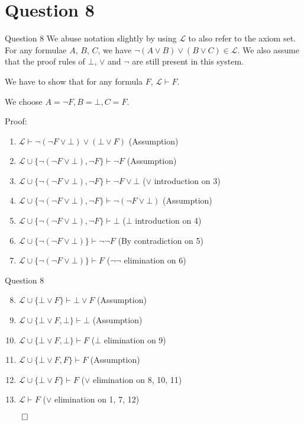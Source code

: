 \documentclass{beamer}
\begin{document}
    \section{Question 8}
    {
        \begin{frame}{Question 8}
            We abuse notation slightly by using $\mathcal{L}$ to also refer to the axiom set. For any formulae $A$, $B$, $C$, we have $\neg \left(A \lor B\right) \lor (B \lor C) \in \mathcal{L}$. We also assume that the proof rules of $\bot$, $\lor$ and $\neg$ are still present in this system.

            We have to show that for any formula $F$, $\mathcal{L} \vdash F$.

            We choose $A = \neg F, B = \bot, C = F$.

            Proof:
            \begin{enumerate}
                \item $\mathcal{L} \vdash \neg (\neg F \lor \bot) \lor (\bot \lor F)$ (Assumption)
                \item $\mathcal{L} \cup \{\neg (\neg F \lor \bot), \neg F\} \vdash \neg F$ (Assumption)
                \item $\mathcal{L} \cup \{\neg (\neg F \lor \bot), \neg F\} \vdash \neg F \lor \bot$ ($\lor$ introduction on 3)
                \item $\mathcal{L} \cup \{\neg (\neg F \lor \bot), \neg F\} \vdash \neg (\neg F \lor \bot)$ (Assumption)
                \item $\mathcal{L} \cup \{\neg (\neg F \lor \bot), \neg F\} \vdash \bot$ ($\bot$ introduction on 4)
                \item $\mathcal{L} \cup \{\neg (\neg F \lor \bot)\} \vdash \neg \neg F$ (By contradiction on 5)
                \item $\mathcal{L} \cup \{\neg (\neg F \lor \bot)\} \vdash F$ ($\neg \neg$ elimination on 6)
            \end{enumerate}
        \end{frame}
        \begin{frame}{Question 8}
            \begin{enumerate}
                \setcounter{enumi}{7}
                \item $\mathcal{L} \cup \{\bot \lor F\} \vdash \bot \lor F$ (Assumption)
                \item $\mathcal{L} \cup \{\bot \lor F, \bot\} \vdash \bot$ (Assumption)
                \item $\mathcal{L} \cup \{\bot \lor F, \bot \} \vdash F$ ($\bot$ elimination on 9)
                \item $\mathcal{L} \cup \{\bot \lor F, F\} \vdash F$ (Assumption)
                \item $\mathcal{L} \cup \{\bot \lor F\} \vdash F$ ($\lor$ elimination on 8, 10, 11)
                \item $\mathcal{L} \vdash F$ ($\lor$ elimination on 1, 7, 12)
            \end{enumerate}
            $\qed$
        \end{frame}
    }
\end{document}
